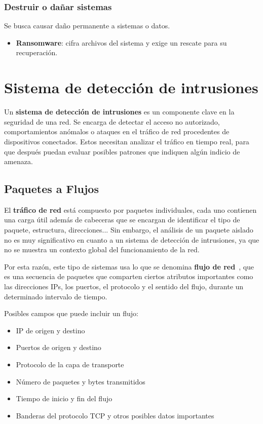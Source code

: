 \subsubsection{Destruir o dañar sistemas}
\label{subsubsec:DestruirSistemas}
Se busca causar daño permanente a sistemas o datos.
\begin{itemize}
    \item \textbf{Ransomware}: cifra archivos del sistema y exige un rescate para su recuperación.
\end{itemize}

\section{Sistema de detección de intrusiones}
\label{sec:DeteccionIntrusiones}
Un \textbf{sistema de detección de intrusiones} es un componente clave en la seguridad de una red. Se encarga de detectar el acceso no autorizado, comportamientos anómalos o ataques en el tráfico de red procedentes de dispositivos conectados. Estos necesitan analizar el tráfico en tiempo real, para que después puedan evaluar posibles patrones que indiquen algún indicio de amenaza.

\subsection{Paquetes a Flujos}
\label{subsec:PaquetesFlujos}
El \textbf{tráfico de red} está compuesto por paquetes individuales, cada uno contienen una carga útil además de cabeceras que se encargan de identificar el tipo de paquete, estructura, direcciones... Sin embargo, el análisis de un paquete aislado no es muy significativo en cuanto a un sistema de detección de intrusiones, ya que no se muestra un contexto global del funcionamiento de la red.

Por esta razón, este tipo de sistemas usa lo que se denomina \textbf{flujo de red}~\cite{flujo_paquetes}, que es una secuencia de paquetes que comparten ciertos atributos importantes como las direcciones IPs, los puertos, el protocolo y el sentido del flujo, durante un determinado intervalo de tiempo.

Posibles campos que puede incluir un flujo:
\begin{itemize}
    \item IP de origen y destino
    \item Puertos de origen y destino
    \item Protocolo de la capa de transporte
    \item Número de paquetes y bytes transmitidos
    \item Tiempo de inicio y fin del flujo
    \item Banderas del protocolo TCP y otros posibles datos importantes
\end{itemize}

